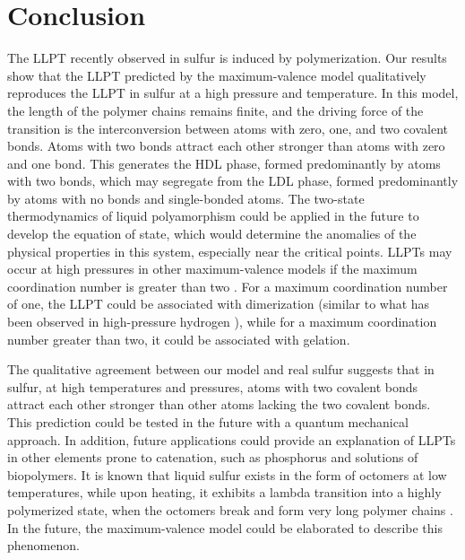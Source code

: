 \documentclass[9pt,twocolumn,twoside,lineno]{pnas-new}
\begin{document}
\section*{Conclusion}
The LLPT recently observed in sulfur \cite{Henry2020} is induced by polymerization. Our results show that the LLPT predicted by the maximum-valence model qualitatively reproduces the LLPT in sulfur at a high pressure and temperature. In this model, the length of the polymer chains remains finite, and the driving force of the transition is the interconversion between atoms with zero, one, and two covalent bonds. Atoms with two bonds attract each other stronger than atoms with zero and one bond. This generates the HDL phase, formed predominantly by atoms with two bonds, which may segregate from the LDL phase, formed predominantly by atoms with no bonds and single-bonded atoms. The two-state thermodynamics of liquid polyamorphism \cite{Anisimov2018, Caupin2021,Longo2021} could be applied in the future to develop the equation of state, which would determine the anomalies of the physical properties in this system, especially near the critical points. LLPTs may occur at high pressures in other maximum-valence models if the maximum coordination number is greater than two \cite{Smallenburg2014}. For a maximum coordination number of one, the LLPT could be associated with dimerization (similar to what has been observed in high-pressure hydrogen \cite{Simpson_Evidence_2016}), while for a maximum coordination number greater than two, it could be associated with gelation.

The qualitative agreement between our model and real sulfur suggests that in sulfur, at high temperatures and pressures, atoms with two covalent bonds attract each other stronger than other atoms lacking the two covalent bonds. This prediction could be tested in the future with a quantum mechanical approach. In addition, future applications could provide an explanation of LLPTs in other elements prone to catenation, such as phosphorus and solutions of biopolymers. It is known that liquid sulfur exists in the form of octomers at low temperatures, while upon heating, it exhibits a lambda transition into a highly polymerized state, when the octomers break and form very long polymer chains \cite{Sauer_Lambda_1967,Bellissent_Sulfur_1994,Kozhevnikov_Sulfur_2004}. In the future, the maximum-valence model could be elaborated to describe this phenomenon.

\end{document}
